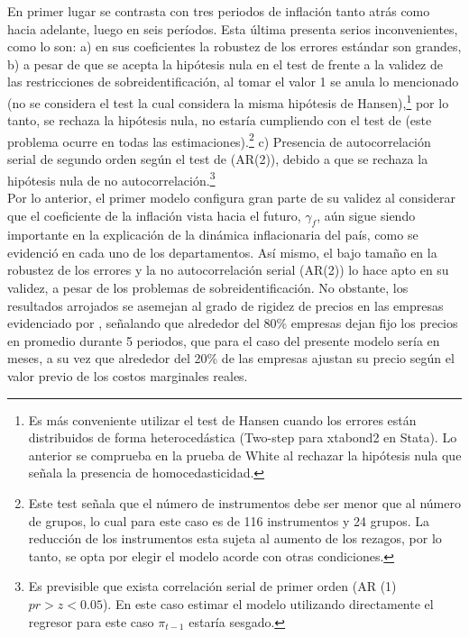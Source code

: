 En primer lugar se contrasta con tres periodos de inflación tanto atrás como hacia adelante, luego en seis períodos.  Esta última presenta serios inconvenientes, como lo son:  a) en sus coeficientes la robustez de los errores estándar son grandes, b)  a pesar de que se acepta la hipótesis nula en el test de \cite{hansen1982generalized}  frente a la validez de las restricciones de sobreidentificación, al tomar el valor 1 se anula lo mencionado (no se considera el test \cite{sargan1958estimation} la cual considera la misma hipótesis de Hansen),\footnote{Es más conveniente utilizar el test de Hansen cuando los errores están distribuidos de forma heterocedástica (Two-step para xtabond2 en Stata). Lo anterior se comprueba en la prueba de White al rechazar la hipótesis nula que señala la presencia de homocedasticidad.}  por lo tanto, se rechaza la hipótesis nula, no estaría cumpliendo con el test de \cite{roodman2009note} (este problema ocurre en todas las estimaciones).\footnote{Este test señala que el número de instrumentos debe ser menor que al número de grupos, lo cual para este caso es de 116 instrumentos y 24 grupos.  La reducción de los instrumentos esta sujeta al aumento de los rezagos, por lo tanto, se opta por elegir el modelo acorde con otras condiciones.} c)  Presencia de autocorrelación serial de segundo orden según el test de \cite{arellano1991some} (AR(2)), debido a que se rechaza la hipótesis nula de no autocorrelación.\footnote{Es previsible que exista correlación serial de primer orden (AR (1) $pr > z < 0.05$). En este caso estimar el modelo utilizando directamente el regresor para este caso $\pi_{t-1}$ estaría sesgado.} \\

Por lo anterior, el primer modelo configura gran parte de su validez al considerar que el coeficiente de la inflación vista hacia el futuro, $\gamma_{f}$, aún sigue siendo importante en la explicación de la dinámica inflacionaria del país, como se evidenció en cada uno de los departamentos. Así mismo, el bajo tamaño en la robustez de los errores y la no autocorrelación serial (AR(2)) lo hace apto en su validez, a pesar de los problemas de sobreidentificación. No obstante, los resultados arrojados se asemejan al grado de rigidez de precios en las empresas evidenciado por \cite{galvis2010estimacion}, señalando que alrededor del 80\% empresas dejan fijo los precios en promedio durante 5 periodos, que para el caso del presente modelo sería en meses, a su vez que alrededor del 20\% de las empresas ajustan su precio según el valor previo de los costos marginales reales.

